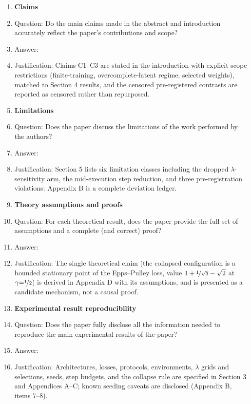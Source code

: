 \begin{enumerate}

\item {\bf Claims}
    \item[] Question: Do the main claims made in the abstract and introduction accurately reflect the paper's contributions and scope?
    \item[] Answer: \answerYes{}
    \item[] Justification: Claims C1--C3 are stated in the introduction with explicit scope restrictions (finite-training, overcomplete-latent regime, selected weights), matched to Section 4 results, and the censored pre-registered contrasts are reported as censored rather than repurposed.

\item {\bf Limitations}
    \item[] Question: Does the paper discuss the limitations of the work performed by the authors?
    \item[] Answer: \answerYes{}
    \item[] Justification: Section 5 lists six limitation classes including the dropped $\lambda$-sensitivity arm, the mid-execution step reduction, and three pre-registration violations; Appendix B is a complete deviation ledger.

\item {\bf Theory assumptions and proofs}
    \item[] Question: For each theoretical result, does the paper provide the full set of assumptions and a complete (and correct) proof?
    \item[] Answer: \answerYes{}
    \item[] Justification: The single theoretical claim (the collapsed configuration is a bounded stationary point of the Epps--Pulley loss, value $1+\nicefrac{1}{\sqrt3}-\sqrt2$ at $\gamma{=}\nicefrac12$) is derived in Appendix D with its assumptions, and is presented as a candidate mechanism, not a causal proof.

\item {\bf Experimental result reproducibility}
    \item[] Question: Does the paper fully disclose all the information needed to reproduce the main experimental results of the paper?
    \item[] Answer: \answerYes{}
    \item[] Justification: Architectures, losses, protocols, environments, $\lambda$ grids and selections, seeds, step budgets, and the collapse rule are specified in Section 3 and Appendices A--C; known seeding caveats are disclosed (Appendix B, items 7--8).


\end{enumerate}
